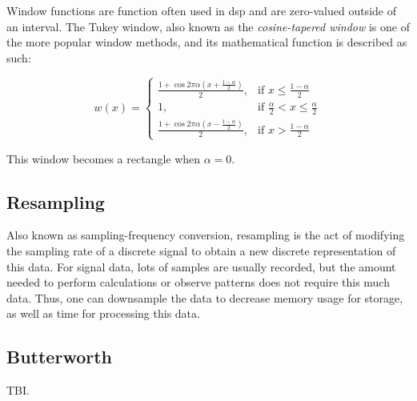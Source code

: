 Window functions are function often used in \acrshort{dsp} and are zero-valued outside of an interval. The Tukey window, also known as the \textit{cosine-tapered window} is one of the more popular window methods, and its mathematical function is described as such: 

\[
    w(x)= 
\begin{cases}
    \frac{1 + \cos{2 \pi \alpha (x + \frac{1-\alpha}{2})}}{2}, & \text{if } x \leq \frac{1-\alpha}{2}\\
    1,              & \text{if } \frac{\alpha}{2} < x \leq \frac{\alpha}{2}\\
    \frac{1 + \cos{2 \pi \alpha (x - \frac{1-\alpha}{2})}}{2}, & \text{if } x > \frac{1-\alpha}{2}
\end{cases}
\]

This window becomes a rectangle when $\alpha = 0$.


\subsection{Resampling}

Also known as sampling-frequency conversion, resampling is the act of modifying the sampling rate of a discrete signal to obtain a new discrete representation of this data. For signal data, lots of samples are usually recorded, but the amount needed to perform calculations or observe patterns does not require this much data. Thus, one can downsample the data to decrease memory usage for storage, as well as time for processing this data. \\


\subsection{Butterworth}

TBI.
